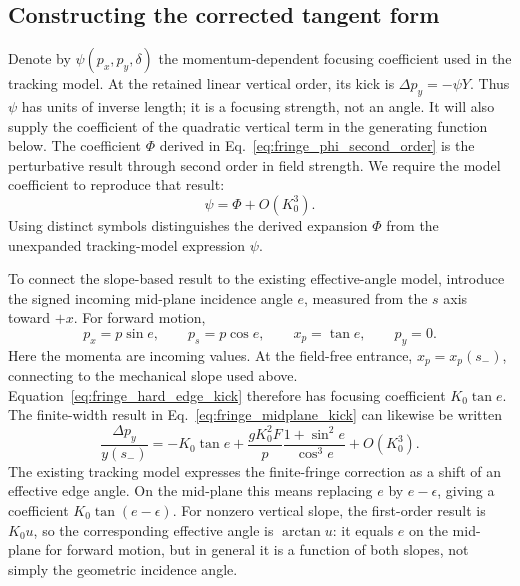 \subsection{Constructing the corrected tangent form}

Denote by $\psi(p_x,p_y,\delta)$ the momentum-dependent focusing coefficient
used in the tracking model. At the retained linear vertical order, its
kick is $\Delta p_y=-\psi Y$. Thus $\psi$ has units of inverse length;
it is a focusing strength, not an angle. It will also supply the coefficient
of the quadratic vertical term in the generating function below.
The coefficient $\Phi$ derived in Eq.~\eqref{eq:fringe_phi_second_order}
is the perturbative result through second order in field strength. We
require the model coefficient to reproduce that result:
\begin{equation}
 \psi=\Phi+O(K_0^3).
\end{equation}
Using distinct symbols distinguishes the derived expansion $\Phi$ from
the unexpanded tracking-model expression $\psi$.

To connect the slope-based result to the existing effective-angle model,
introduce the signed incoming mid-plane incidence angle $e$, measured
from the $s$ axis toward $+x$. For forward motion,
\begin{equation}
 p_x=p\sin e,\qquad p_s=p\cos e,\qquad x_p=\tan e,
 \qquad p_y=0.
 \label{eq:fringe_incidence_angle}
\end{equation}
Here the momenta are incoming values. At the field-free entrance,
$x_p=x_p(s_-)$, connecting to the mechanical slope used above.
Equation~\eqref{eq:fringe_hard_edge_kick} therefore has
focusing coefficient $K_0\tan e$. The finite-width result in
Eq.~\eqref{eq:fringe_midplane_kick} can likewise be written
\begin{equation}
 \frac{\Delta p_y}{y(s_-)}=-K_0\tan e
 +\frac{gK_0^2F}{p}\frac{1+\sin^2e}{\cos^3e}+O(K_0^3).
 \label{eq:fringe_angle_kick}
\end{equation}
The existing tracking model expresses the finite-fringe correction as a
shift of an effective edge angle. On the mid-plane this means replacing
$e$ by $e-\epsilon$, giving a coefficient $K_0\tan(e-\epsilon)$.
For nonzero vertical slope, the first-order result is $K_0u$, so the
corresponding effective angle is $\arctan u$: it equals $e$ on the
mid-plane for forward motion, but in general it is a function of both
slopes, not simply the geometric incidence angle.

